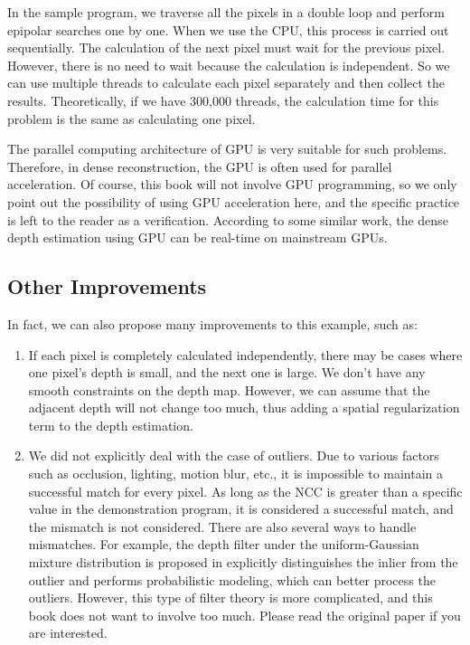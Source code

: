 In the sample program, we traverse all the pixels in a double loop and perform epipolar searches one by one. When we use the CPU, this process is carried out sequentially. The calculation of the next pixel must wait for the previous pixel. However, there is no need to wait because the calculation is independent. So we can use multiple threads to calculate each pixel separately and then collect the results. Theoretically, if we have 300,000 threads, the calculation time for this problem is the same as calculating one pixel.

The parallel computing architecture of GPU is very suitable for such problems. Therefore, in dense reconstruction, the GPU is often used for parallel acceleration. Of course, this book will not involve GPU programming, so we only point out the possibility of using GPU acceleration here, and the specific practice is left to the reader as a verification. According to some similar work, the dense depth estimation using GPU can be real-time on mainstream GPUs.

\subsection{Other Improvements}
In fact, we can also propose many improvements to this example, such as:

\begin{enumerate}
	\item If each pixel is completely calculated independently, there may be cases where one pixel's depth is small, and the next one is large. We don't have any smooth constraints on the depth map. However, we can assume that the adjacent depth will not change too much, thus adding a spatial regularization term to the depth estimation. 
	\item We did not explicitly deal with the case of outliers. Due to various factors such as occlusion, lighting, motion blur, etc., it is impossible to maintain a successful match for every pixel. As long as the NCC is greater than a specific value in the demonstration program, it is considered a successful match, and the mismatch is not considered. There are also several ways to handle mismatches. For example, the depth filter under the uniform-Gaussian mixture distribution is proposed in \cite{Vogiatzis2011} explicitly distinguishes the inlier from the outlier and performs probabilistic modeling, which can better process the outliers. However, this type of filter theory is more complicated, and this book does not want to involve too much. Please read the original paper if you are interested.
\end{enumerate}

